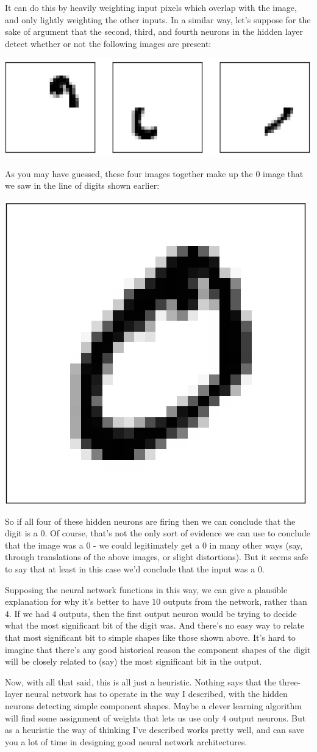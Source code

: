 \documentclass[a4paper,12pt]{report}%
\begin{document}
It can do this by heavily weighting input pixels which overlap with the image, and only lightly weighting the other inputs. In a similar way, let's suppose for the sake of argument that the second, third, and fourth neurons in the hidden layer detect whether or not the following images are present:
\begin{center}
 \includegraphics[width=0.5\linewidth]{images/mnist_other_features.png}
\end{center}

As you may have guessed, these four images together make up the $0$ image that we saw in the line of digits shown earlier:
\begin{center}
 \includegraphics[width=0.15\linewidth]{images/mnist_complete_zero.png}
\end{center}

So if all four of these hidden neurons are firing then we can conclude that the digit is a $0$. Of course, that's not the only sort of evidence we can use to conclude that the image was a $0$ - we could legitimately get a $0$ in many other ways (say, through translations of the above images, or slight distortions). But it seems safe to say that at least in this case we'd conclude that the input was a $0$.

Supposing the neural network functions in this way, we can give a plausible explanation for why it's better to have $10$ outputs from the network, rather than $4$. If we had $4$ outputs, then the first output neuron would be trying to decide what the most significant bit of the digit was. And there's no easy way to relate that most significant bit to simple shapes like those shown above. It's hard to imagine that there's any good historical reason the component shapes of the digit will be closely related to (say) the most significant bit in the output.

Now, with all that said, this is all just a heuristic. Nothing says that the three-layer neural network has to operate in the way I described, with the hidden neurons detecting simple component shapes. Maybe a clever learning algorithm will find some assignment of weights that lets us use only $4$ output neurons. But as a heuristic the way of thinking I've described works pretty well, and can save you a lot of time in designing good neural network  architectures.
\end{document}
